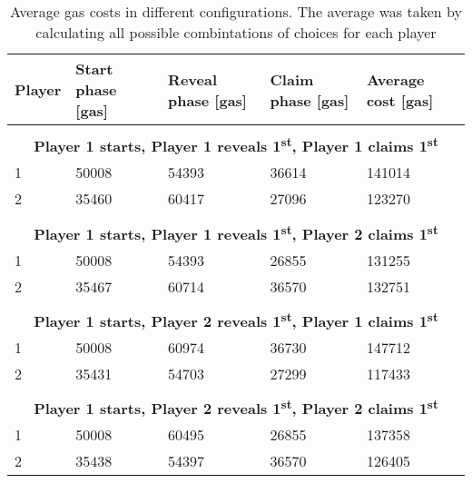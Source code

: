 \documentclass{article}
\begin{document}
    \begin{table}[H]
        \centering
        \begin{tabular}{|l l l l l|}
            \hline
            Player & Start phase [gas] & Reveal phase [gas]
            & Claim phase [gas] & Average cost [gas] \\
            \hline
            \multicolumn{4}{c}{} \\[-.5pt]
            \multicolumn{5}{c}{{\bfseries Player 1 starts, Player 1
            reveals 1\textsuperscript{st}, Player 1 claims
            1\textsuperscript{st}}} \\
            \hline
            1 & 50008 & 54393 & 36614 & 141014 \\
            2 & 35460 & 60417 & 27096 & 123270 \\
            \hline
            \multicolumn{4}{c}{} \\[-.5pt]
            \multicolumn{5}{c}{{\bfseries Player 1 starts, Player 1
            reveals 1\textsuperscript{st}, Player 2 claims
            1\textsuperscript{st}}} \\
            \hline
            1 & 50008 & 54393 & 26855 & 131255 \\
            2 & 35467 & 60714 & 36570 & 132751 \\
            \hline
            \multicolumn{4}{c}{} \\[-.5pt]
            \multicolumn{5}{c}{{\bfseries Player 1 starts, Player 2
            reveals 1\textsuperscript{st}, Player 1 claims
            1\textsuperscript{st}}} \\
            \hline
            1 & 50008 & 60974 & 36730 & 147712 \\
            2 & 35431 & 54703 & 27299 & 117433 \\
            \hline
            \multicolumn{4}{c}{} \\[-.5pt]
            \multicolumn{5}{c}{{\bfseries Player 1 starts, Player 2
            reveals 1\textsuperscript{st}, Player 2 claims
            1\textsuperscript{st}}} \\
            \hline
            1 & 50008 & 60495 & 26855 & 137358 \\
            2 & 35438 & 54397 & 36570 & 126405 \\
            \hline
        \end{tabular}

        \caption{Average gas costs in different
        configurations. The average was taken by calculating
        all possible combintations of choices for each
        player}
        \label{tab:gasTable}
    \end{table}
\end{document}
